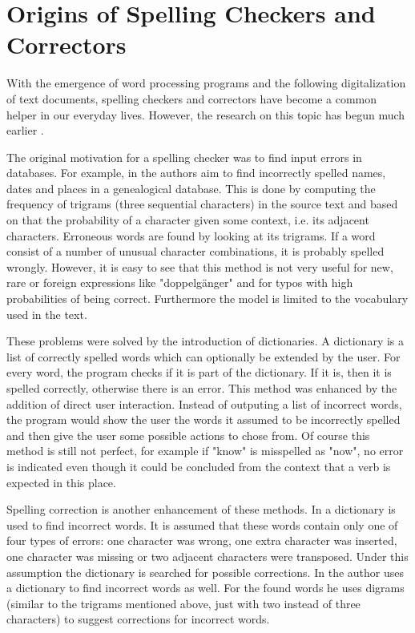 \section{Origins of Spelling Checkers and Correctors}

With the emergence of word processing programs and the following digitalization of text documents, spelling checkers and correctors have become a common helper in our everyday lives. However, the research on this topic has begun much earlier \cite{program_check_correction}.

The original motivation for a spelling checker was to find input errors in databases. For example, in \cite{data_correction} the authors aim to find incorrectly spelled names, dates and places in a genealogical database. This is done by computing the frequency of trigrams (three sequential characters) in the source text and based on that the probability of a character given some context, i.e. its adjacent characters. Erroneous words are found by looking at its trigrams. If a word consist of a number of unusual character combinations, it is probably spelled wrongly. However, it is easy to see that this method is not very useful for new, rare or foreign expressions like "doppelg\"{a}nger" and for typos with high probabilities of being correct. Furthermore the model is limited to the vocabulary used in the text.

These problems were solved by the introduction of dictionaries. A dictionary is a list of correctly spelled words which can optionally be extended by the user. For every word, the program checks if it is part of the dictionary. If it is, then it is spelled correctly, otherwise there is an error. This method was enhanced by the addition of direct user interaction. Instead of outputing a list of incorrect words, the program would show the user the words it assumed to be incorrectly spelled and then give the user some possible actions to chose from. Of course this method is still not perfect, for example if "know" is misspelled as "now", no error is indicated even though it could be concluded from the context that a verb is expected in this place.

Spelling correction is another enhancement of these methods. In \cite{dictionary_correction} a dictionary is used to find incorrect words. It is assumed that these words contain only one of four types of errors: one character was wrong, one extra character was inserted, one character was missing or two adjacent characters were transposed. Under this assumption the dictionary is searched for possible corrections. In \cite{digram_correction} the author uses a dictionary to find incorrect words as well. For the found words he uses digrams (similar to the trigrams mentioned above, just with two instead of three characters) to suggest corrections for incorrect words.

